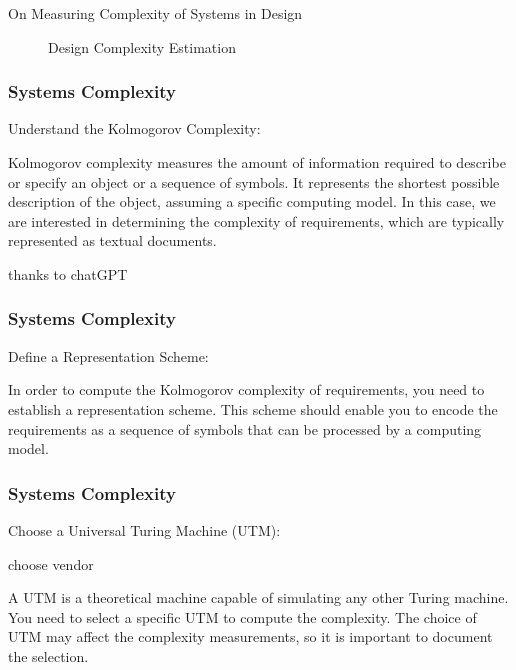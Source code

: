 \begin{frame}
\begin{block}{On Measuring  Complexity of Systems in Design }
\begin{figure}[hbt!]
\caption{ Design Complexity Estimation }
\label{andesignwrkflowinAIapplicaion}
\end{figure}
 
\end{block}
\end{frame}


\newpage
\begin{frame}
\frametitle{Systems Complexity }
\begin{block}{Understand the Kolmogorov Complexity:}


 Kolmogorov complexity measures the amount of information required to describe or specify an object or a sequence of symbols. It represents the shortest possible description of the object, assuming a specific computing model. In this case, we are interested in determining the complexity of requirements, which are typically represented as textual documents.

 thanks to chatGPT
 
\end{block}
\end{frame}



\newpage
\begin{frame}
\frametitle{Systems Complexity }
\begin{block}{Define a Representation Scheme:}

 In order to compute the Kolmogorov complexity of requirements, you need to establish a representation scheme. This scheme should enable you to encode the requirements as a sequence of symbols that can be processed by a computing model.


\end{block}
\end{frame}



\newpage
\begin{frame}
\frametitle{Systems Complexity }
\begin{block}{Choose a Universal Turing Machine (UTM):}

choose vendor 


 A UTM is a theoretical machine capable of simulating any other Turing machine. You need to select a specific UTM to compute the complexity. The choice of UTM may affect the complexity measurements, so it is important to document the selection.


\end{block}
\end{frame}


